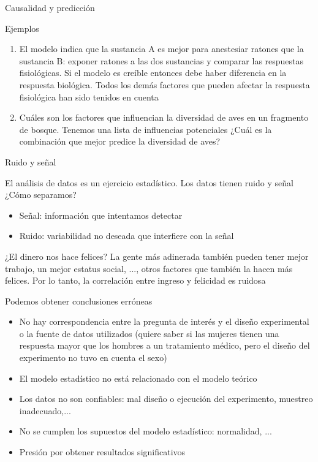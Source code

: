 \documentclass{beamer}
\begin{document}
\begin{frame}{Causalidad y predicción}

Ejemplos

\begin{enumerate}
    \item El modelo indica que la sustancia A es mejor para anestesiar ratones que la sustancia B: exponer ratones a las dos sustancias y comparar las respuestas fisiológicas. Si el modelo es creíble entonces debe haber diferencia en la respuesta biológica. Todos los demás factores que pueden afectar la respuesta fisiológica han sido tenidos en cuenta
    \item Cuáles son los factores que influencian la diversidad de aves en un fragmento de bosque. Tenemos una lista de influencias potenciales ¿Cuál es la combinación que mejor predice la diversidad de aves?
\end{enumerate}
    
\end{frame}

\begin{frame}{Ruido y señal}

El análisis de datos es un ejercicio estadístico. Los datos tienen ruido y señal ¿Cómo separamos?

\begin{itemize}
    \item Señal: información que intentamos detectar
    \item Ruido: variabilidad no deseada que interfiere con la señal
\end{itemize}

¿El dinero nos hace felices? La gente más adinerada también pueden tener mejor trabajo, un mejor estatus social, ..., otros factores que también la hacen más felices. Por lo tanto, la correlación entre ingreso y felicidad es ruidosa
    
\end{frame}

\begin{frame}{Podemos obtener conclusiones erróneas}

\begin{itemize}
    \item No hay correspondencia entre la pregunta de interés y el diseño experimental o la fuente de datos utilizados (quiere saber si las mujeres tienen una respuesta mayor que los hombres a un tratamiento médico, pero el diseño del experimento no tuvo en cuenta el sexo)
    \item El modelo estadístico no está relacionado con el modelo teórico
    \item Los datos no son confiables: mal diseño o ejecución del experimento, muestreo inadecuado,...
    \item No se cumplen los supuestos del modelo estadístico: normalidad, ...
    \item Presión por obtener resultados significativos
\end{itemize}
    
\end{frame}
\end{document}
